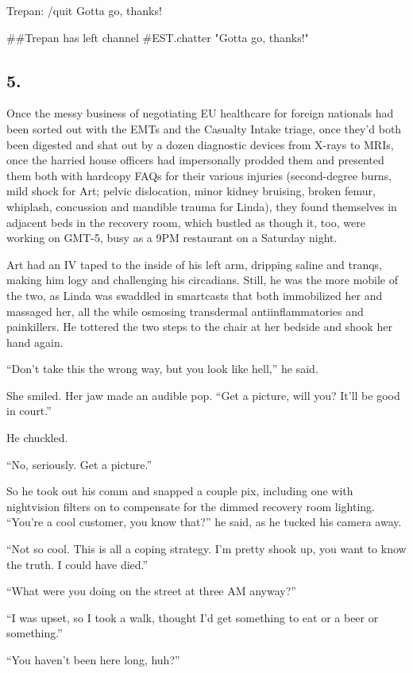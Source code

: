 Trepan: /quit Gotta go, thanks!

\#\#Trepan has left channel \#EST.chatter "Gotta go, thanks!"

\subsection{5.}

Once the messy business of negotiating EU healthcare for foreign
nationals had been sorted out with the EMTs and the Casualty Intake
triage, once they’d both been digested and shat out by a dozen
diagnostic devices from X-rays to MRIs, once the harried house
officers had impersonally prodded them and presented them both with
hardcopy FAQs for their various injuries (second-degree burns, mild
shock for Art; pelvic dislocation, minor kidney bruising, broken
femur, whiplash, concussion and mandible trauma for Linda), they
found themselves in adjacent beds in the recovery room, which
bustled as though it, too, were working on GMT-5, busy as a 9PM
restaurant on a Saturday night.

Art had an IV taped to the inside of his left arm, dripping saline
and tranqs, making him logy and challenging his circadians. Still,
he was the more mobile of the two, as Linda was swaddled in
smartcasts that both immobilized her and massaged her, all the
while osmosing transdermal antiinflammatories and painkillers. He
tottered the two steps to the chair at her bedside and shook her
hand again.

“Don’t take this the wrong way, but you look like hell,” he said.

She smiled. Her jaw made an audible pop. “Get a picture, will you?
It’ll be good in court.”

He chuckled.

“No, seriously. Get a picture.”

So he took out his comm and snapped a couple pix, including one
with nightvision filters on to compensate for the dimmed recovery
room lighting. “You’re a cool customer, you know that?” he said, as
he tucked his camera away.

“Not so cool. This is all a coping strategy. I’m pretty shook up,
you want to know the truth. I could have died.”

“What were you doing on the street at three AM anyway?”

“I was upset, so I took a walk, thought I’d get something to eat or
a beer or something.”

“You haven’t been here long, huh?”

